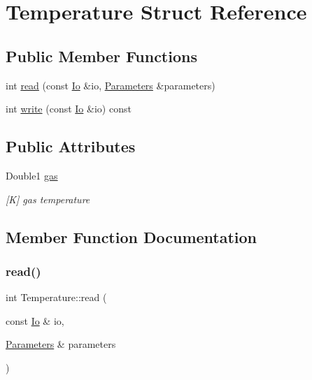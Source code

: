 \hypertarget{structTemperature}{}\section{Temperature Struct Reference}
\label{structTemperature}
\subsection*{Public Member Functions}
\begin{DoxyCompactItemize}
\item 
int \mbox{\hyperlink{structTemperature_a397a564f10a59b921ff8db065eedd2fc}{read}} (const \mbox{\hyperlink{structIo}{Io}} \&io, \mbox{\hyperlink{classParameters}{Parameters}} \&parameters)
\item 
int \mbox{\hyperlink{structTemperature_a7ad317e6e3ef56b24c628bc838b2ac4e}{write}} (const \mbox{\hyperlink{structIo}{Io}} \&io) const
\end{DoxyCompactItemize}
\subsection*{Public Attributes}
\begin{DoxyCompactItemize}
\item 
\mbox{\label{structTemperature_a4a6bee795a4871a93b8e66445d4ae177}} 
Double1 \mbox{\hyperlink{structTemperature_a4a6bee795a4871a93b8e66445d4ae177}{gas}}
\begin{DoxyCompactList}\small\item\em \mbox{[}K\mbox{]} gas temperature \end{DoxyCompactList}\end{DoxyCompactItemize}


\subsection{Member Function Documentation}
\mbox{\label{structTemperature_a397a564f10a59b921ff8db065eedd2fc}} 
\subsubsection{\texorpdfstring{read()}{read()}}
{\footnotesize\ttfamily int Temperature\+::read (\begin{DoxyParamCaption}\item[{const \mbox{\hyperlink{structIo}{Io}} \&}]{io,  }\item[{\mbox{\hyperlink{classParameters}{Parameters}} \&}]{parameters }\end{DoxyParamCaption})}


